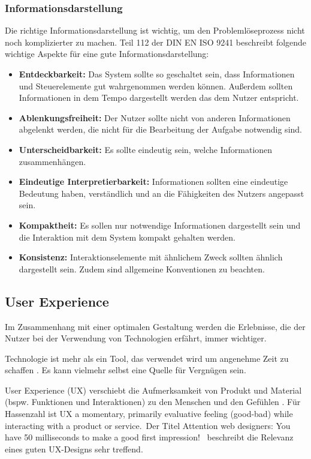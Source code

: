 \subsubsection*{Informationsdarstellung}
Die richtige Informationsdarstellung ist wichtig, um den Problemlöseprozess nicht noch komplizierter zu machen. Teil 112 \cite{ISO9241-112} der DIN EN ISO 9241 beschreibt folgende wichtige Aspekte für eine gute Informationsdarstellung:
\begin{itemize}
\item \textbf{Entdeckbarkeit:} Das System sollte so geschaltet sein, dass Informationen und Steuerelemente gut wahrgenommen werden können. Außerdem sollten Informationen in dem Tempo dargestellt werden das dem Nutzer entspricht.
\item \textbf{Ablenkungsfreiheit:} Der Nutzer sollte nicht von anderen Informationen abgelenkt werden, die nicht für die Bearbeitung der Aufgabe notwendig sind.
\item \textbf{Unterscheidbarkeit:} Es sollte eindeutig sein, welche Informationen zusammenhängen.
\item \textbf{Eindeutige Interpretierbarkeit:} Informationen sollten eine eindeutige Bedeutung haben, verständlich und an die Fähigkeiten des Nutzers angepasst sein.
\item \textbf{Kompaktheit:} Es sollen nur notwendige Informationen dargestellt sein und die Interaktion mit dem System kompakt gehalten werden.
\item \textbf{Konsistenz:} Interaktionselemente mit ähnlichem Zweck sollten ähnlich dargestellt sein. Zudem sind allgemeine Konventionen zu beachten.
\end{itemize}

\subsection{User Experience}
Im Zusammenhang mit einer optimalen Gestaltung werden die Erlebnisse, die der Nutzer bei der Verwendung von Technologien erfährt, immer wichtiger. 

Technologie ist mehr als ein Tool, das verwendet wird um angenehme Zeit zu schaffen . Es kann vielmehr selbst eine Quelle für Vergnügen sein. \cite{Hassenzahl2008}

User Experience (UX) verschiebt die Aufmerksamkeit von Produkt und Material (bspw. Funktionen und Interaktionen) zu den Menschen und den Gefühlen \cite{Hassenzahl2008}. Für Hassenzahl \citep[12]{Hassenzahl2008} ist UX \glqq a momentary, primarily evaluative feeling (good-bad) while interacting with a product or service.\grqq \ Der Titel \glqq Attention web designers: You have 50 milliseconds to make a good first impression!\grqq \ \citep[92]{Hassenzahl2006} beschreibt die Relevanz eines guten UX-Designs sehr treffend. 
\cite{Hassenzahl2006}

